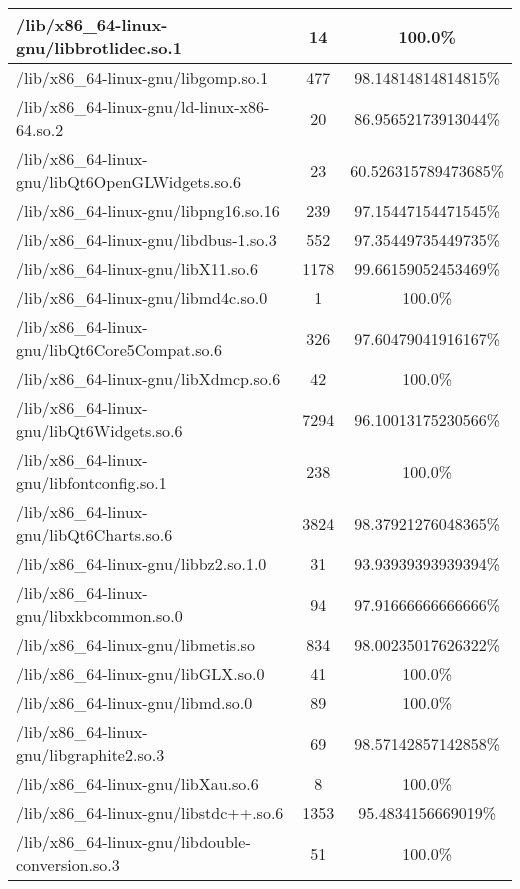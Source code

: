 \begin{table}[h]
\begin{tabular}{l|c|c}
/lib/x86\_64-linux-gnu/libbrotlidec.so.1 & 14 & 100.0\% \\ \hline
/lib/x86\_64-linux-gnu/libgomp.so.1 & 477 & 98.14814814814815\% \\ \hline
\colorbox{gray!20}{/lib/x86\_64-linux-gnu/ld-linux-x86-64.so.2} & 20 & 86.95652173913044\% \\ \hline
\colorbox{gray!20}{/lib/x86\_64-linux-gnu/libQt6OpenGLWidgets.so.6} & 23 & 60.526315789473685\% \\ \hline
/lib/x86\_64-linux-gnu/libpng16.so.16 & 239 & 97.15447154471545\% \\ \hline
/lib/x86\_64-linux-gnu/libdbus-1.so.3 & 552 & 97.35449735449735\% \\ \hline
/lib/x86\_64-linux-gnu/libX11.so.6 & 1178 & 99.66159052453469\% \\ \hline
/lib/x86\_64-linux-gnu/libmd4c.so.0 & 1 & 100.0\% \\ \hline
\colorbox{gray!20}{/lib/x86\_64-linux-gnu/libQt6Core5Compat.so.6} & 326 & 97.60479041916167\% \\ \hline
/lib/x86\_64-linux-gnu/libXdmcp.so.6 & 42 & 100.0\% \\ \hline
\colorbox{gray!20}{/lib/x86\_64-linux-gnu/libQt6Widgets.so.6} & 7294 & 96.10013175230566\% \\ \hline
/lib/x86\_64-linux-gnu/libfontconfig.so.1 & 238 & 100.0\% \\ \hline
\colorbox{gray!20}{/lib/x86\_64-linux-gnu/libQt6Charts.so.6} & 3824 & 98.37921276048365\% \\ \hline
/lib/x86\_64-linux-gnu/libbz2.so.1.0 & 31 & 93.93939393939394\% \\ \hline
/lib/x86\_64-linux-gnu/libxkbcommon.so.0 & 94 & 97.91666666666666\% \\ \hline
\colorbox{gray!20}{/lib/x86\_64-linux-gnu/libmetis.so} & 834 & 98.00235017626322\% \\ \hline
/lib/x86\_64-linux-gnu/libGLX.so.0 & 41 & 100.0\% \\ \hline
/lib/x86\_64-linux-gnu/libmd.so.0 & 89 & 100.0\% \\ \hline
/lib/x86\_64-linux-gnu/libgraphite2.so.3 & 69 & 98.57142857142858\% \\ \hline
/lib/x86\_64-linux-gnu/libXau.so.6 & 8 & 100.0\% \\ \hline
\colorbox{gray!20}{/lib/x86\_64-linux-gnu/libstdc++.so.6} & 1353 & 95.4834156669019\% \\ \hline
/lib/x86\_64-linux-gnu/libdouble-conversion.so.3 & 51 & 100.0\% \\ \hline

\end{tabular}
\end{table}
